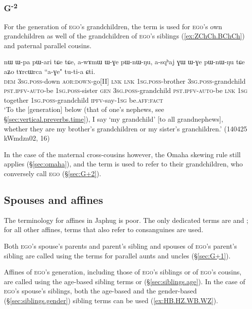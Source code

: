 \subsubsection{G\textsuperscript{-2}} \label{sec:G-2}
For the generation of \textsc{ego}'s grandchildren, the term  is used for \textsc{ego}'s own grandchildren as well of the grandchildren of \textsc{ego}'s siblings (\ref{ex:ZChCh.BChCh}) and paternal parallel cousins.

\begin{exe}
\ex \label{ex:ZChCh.BChCh}
\gll nɯ ɯ-pa pɯ-ari tɕe tɕe, a-wɤmɯ ɯ-ɣe pɯ-nɯ-ŋu, a-sqʰaj ɣɯ ɯ-ɣe pɯ-nɯ-ŋu tɕe aʑo tɤrcɯrca ``a-ɣe" tu-ti-a ɕti. \\
\textsc{dem} \textsc{3sg}.\textsc{poss}-down \textsc{aor}:\textsc{down}-go[II] \textsc{lnk} \textsc{lnk} \textsc{1sg}.\textsc{poss}-brother \textsc{3sg}.\textsc{poss}-grandchild \textsc{pst}.\textsc{ipfv}-\textsc{auto}-be \textsc{1sg}.\textsc{poss}-sister \textsc{gen} \textsc{3sg}.\textsc{poss}-grandchild \textsc{pst}.\textsc{ipfv}-\textsc{auto}-be \textsc{lnk} \textsc{1sg} together \textsc{1sg}.\textsc{poss}-grandchild \textsc{ipfv}-say-\textsc{1sg} be.\textsc{aff}:\textsc{fact} \\
\glt `To the [generation] below (that of one's nephews, see §\ref{sec:vertical.preverbs.time}), I say  `my grandchild' [to all grandnephews], whether they are my brother's grandchildren or my sister's granchildren.' (140425 kWmdza02, 16)
\end{exe}

In the case of the maternal cross-cousins however, the Omaha skewing rule still applies (§\ref{sec:omaha}), and the term  is used to refer to their grandchildren, who conversely call \textsc{ego}  (§\ref{sec:G+2}).


\subsection{Spouses and affines} \label{sec:spouses}
The terminology for affines in Japhug is poor. The only dedicated terms are  and ; for all other affines, terms that also refer to consanguines are used.

Both \textsc{ego}'s spouse's parents and parent's sibling and spouses of \textsc{ego}'s parent's sibling are called using the terms for parallel aunts and uncles (§\ref{sec:G+1}).

Affines of \textsc{ego}'s generation, including those of \textsc{ego}'s siblings or of \textsc{ego}'s cousins, are called using the age-based sibling terms  or  (§\ref{sec:siblings.age}). In the case of \textsc{ego}'s spouse's siblings, both the age-based and the gender-based (§\ref{sec:siblings.gender}) sibling terms can be used (\ref{ex:HB.HZ.WB.WZ}).


